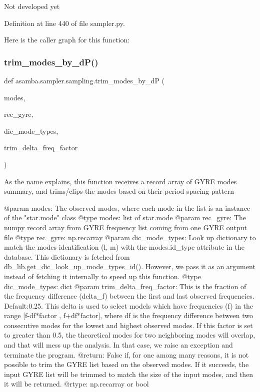 \begin{DoxyVerb}Not developed yet \end{DoxyVerb}
 

Definition at line 440 of file sampler.\+py.

Here is the caller graph for this function\+:
\mbox{\label{classasamba_1_1sampler_1_1sampling_a8058c0e4f2aa8642f7b19daeb016d73a}} 
\subsubsection{\texorpdfstring{trim\+\_\+modes\+\_\+by\+\_\+d\+P()}{trim\_modes\_by\_dP()}}
{\footnotesize\ttfamily def asamba.\+sampler.\+sampling.\+trim\+\_\+modes\+\_\+by\+\_\+dP (\begin{DoxyParamCaption}\item[{}]{modes,  }\item[{}]{rec\+\_\+gyre,  }\item[{}]{dic\+\_\+mode\+\_\+types,  }\item[{}]{trim\+\_\+delta\+\_\+freq\+\_\+factor }\end{DoxyParamCaption})}

\begin{DoxyVerb}As the name explains, this function receives a record array of GYRE modes summary, and trims/clips
the modes based on their period spacing pattern

@param modes: The observed modes, where each mode in the list is an instance of the "star.mode" class
@type modes: list of star.mode
@param rec_gyre: The numpy record array from GYRE frequency list coming from one GYRE output file
@type rec_gyre: np.recarray
@param dic_mode_types: Look up dictionary to match the modes identification (l, m) with the modes.id_type
  attribute in the database. This dictionary is fetched from db_lib.get_dic_look_up_mode_types_id(). 
  However, we pass it as an argument instead of fetching it internally to speed up this function.
@type dic_mode_types: dict
@param trim_delta_freq_factor: This is the fraction of the frequency difference (delta_f) between the 
  first and last observed frequencies. Default:0.25. This delta is used to select models which have
  frequencies (f) in the range [f-df*factor , f+df*factor], where df is the frequency difference between
  two consecutive modes for the lowest and highest observed modes. If this factor is set to greater than
  0.5, the theoretical modes for two neighboring modes will overlap, and that will mess up the analysis.
  In that case, we raise an exception and terminate the program.
@return: False if, for one among many reasons, it is not possible to trim the GYRE list based on the 
  observed modes. If it succeeds, the input GYRE list will be trimmed to match the size of the input
  modes, and then it will be returned.
@rtype: np.recarray or bool
\end{DoxyVerb}
 

